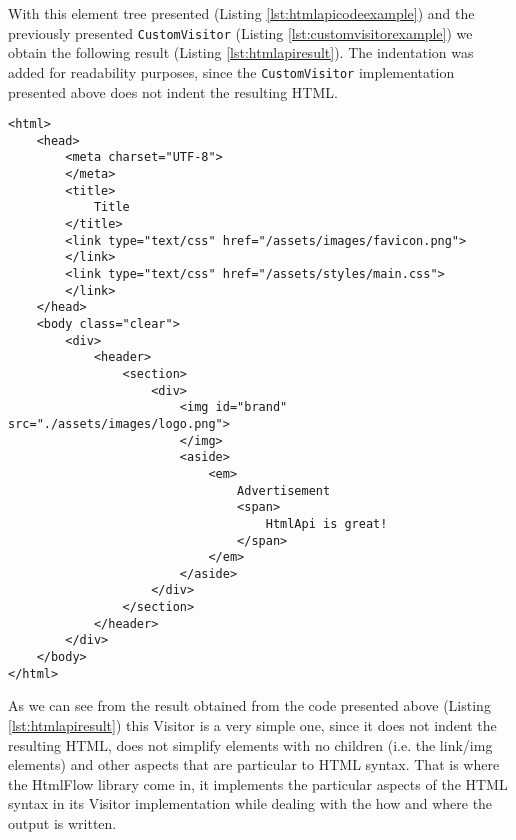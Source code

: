 \noindent
With this element tree presented (Listing \ref{lst:htmlapicodeexample}) and the previously presented \texttt{CustomVisitor} (Listing \ref{lst:customvisitorexample}) we obtain the following result (Listing \ref{lst:htmlapiresult}). The indentation was added for readability purposes, since the \texttt{CustomVisitor} implementation presented above does not indent the resulting \ac{HTML}.

\bigskip


\begin{minipage}{\linewidth}
\begin{lstlisting}[caption={HtmlApi Visitor Result},captionpos=b,label={lst:htmlapiresult}]
<html>
    <head>
        <meta charset="UTF-8">
        </meta>
        <title>
            Title
        </title>
        <link type="text/css" href="/assets/images/favicon.png">
        </link>
        <link type="text/css" href="/assets/styles/main.css">
        </link>
    </head>
    <body class="clear">
        <div>
            <header>
                <section>
                    <div>
                        <img id="brand" src="./assets/images/logo.png">
                        </img>
                        <aside>
                            <em>
                                Advertisement
                                <span>
                                    HtmlApi is great!
                                </span>
                            </em>
                        </aside>
                    </div>
                </section>
            </header>
        </div>
    </body>
</html>                          
\end{lstlisting}
\end{minipage}

\noindent
As we can see from the result obtained from the code presented above (Listing \ref{lst:htmlapiresult}) this Visitor is a very simple one, since it does not indent the resulting \ac{HTML}, does not simplify elements with no children (i.e. the link/img elements) and other aspects that are particular to \ac{HTML} syntax. That is where the HtmlFlow library come in, it implements the particular aspects of the \ac{HTML} syntax in its Visitor implementation while dealing with the how and where the output is written. 